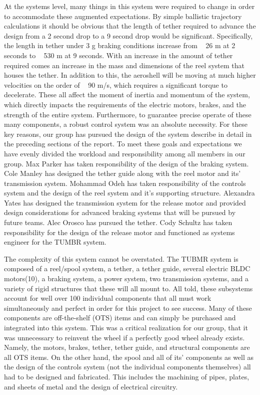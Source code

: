 At the systems level, many things in this system were required to change in order to accommodate these augmented expectations. By simple ballistic trajectory calculations it should be obvious that the length of tether required to advance the design from a 2 second drop to a 9 second drop would be significant. Specifically, the length in tether under 3 g braking conditions increase from ~ 26 m at 2 seconds to ~ 530 m at 9 seconds. With an increase in the amount of tether required comes an increase in the mass and dimensions of the reel system that houses the tether. In addition to this, the aeroshell will be moving at much higher velocities on the order of ~ 90 m/s, which requires a significant torque to decelerate. These all affect the moment of inertia and momentum of the system, which directly impacts the requirements of the electric motors, brakes, and the strength of the entire system. Furthermore, to guarantee precise operate of these many components, a robust control system was an absolute necessity. For these key reasons, our group has pursued the design of the system describe in detail in the preceding sections of the report. To meet these goals and expectations we have evenly divided the workload and responsibility among all members in our group. Max Parker has taken responsibility of the design of the braking system. Cole Manley has designed the tether guide along with the reel motor and its' transmission system. Mohammad Odeh has taken responsibility of the controls system and the design of the reel system and it's supporting structure. Alexandra Yates has designed the transmission system for the release motor and provided design considerations for advanced braking systems that will be pursued by future teams. Alec Orosco has pursued the tether. Cody Schultz has taken responsibility for the design of the release motor and functioned as systems engineer for the TUMBR system.

The complexity of this system cannot be overstated. The TUBMR system is composed of a reel/spool system, a tether, a tether guide, several electric BLDC motors(10), a braking system, a power system, two transmission systems, and a variety of rigid structures that these will all mount to. All told, these subsystems account for well over 100 individual components that all must work simultaneously and perfect in order for this project to see success. Many of these components are off-the-shelf (OTS) items and can simply be purchased and integrated into this system. This was a critical realization for our group, that it was unnecessary to reinvent the wheel if a perfectly good wheel already exists. Namely, the motors, brakes, tether, tether guide, and structural components are all OTS items. On the other hand, the spool and all of its' components as well as the design of the controls system (not the individual components themselves) all had to be designed and fabricated. This includes the machining of pipes, plates, and sheets of metal and the design of electrical circuitry.


